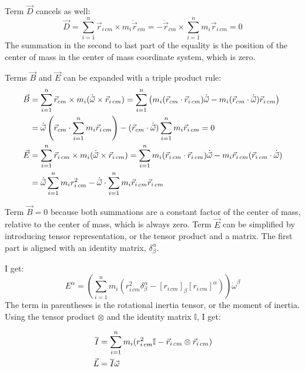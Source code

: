 \documentclass[10pt]{article}
\begin{document}
Term $\vec{D}$ cancels as well:
\begin{equation*}
    \vec{D} = \sum_{i=1}^n\vec{r}_{i\,cm}\times m_i\ddot{\vec{r}}_{cm} 
        = -\ddot{\vec{r}}_{cm}\times\sum_{i=1}^n m_i\vec{r}_{i\,cm} = 0
\end{equation*}
The summation in the second to last part of the equality is the 
position of the center of mass in the center of mass coordinate system, which 
is zero.

Terms $\vec{B}$ and $\vec{E}$ can be expanded with a triple product rule:
\begin{align}
    \vec{B} &= \sum_{i=1}^n\vec{r}_{cm}\times m_i
        (\dot{\vec{\omega}}\times\vec{r}_{i\,cm}) =
    \sum_{i=1}^n 
        \left(m_i(\vec{r}_{cm}\cdot\vec{r}_{i\,cm})\dot{\vec{\omega}} -
        m_i(\vec{r}_{cm}\cdot\dot{\vec{\omega}})\vec{r}_{i\,cm}\right) \notag \\
    &=\dot{\vec{\omega}}\left(\vec{r}_{cm}\cdot\sum_{i=1}^n 
        m_i\vec{r}_{i\,cm}\right) -
       (\vec{r}_{cm}\cdot\dot{\vec{\omega}})\sum_{i=1}^n
        m_i\vec{r}_{i\,cm} = 0 \notag \\
    \vec{E}&=\sum_{i=1}^n\vec{r}_{i\,cm}\times m_i 
        (\dot{\vec{\omega}}\times\vec{r}_{i\,cm}) =
    \sum_{i=1}^n 
        m_i(\vec{r}_{i\,cm}\cdot\vec{r}_{i\,cm})\dot{\vec{\omega}} - 
        m_i\vec{r}_{i\,cm}(\vec{r}_{i\,cm}\cdot\dot{\vec{\omega}})\notag \\
    &=\dot{\vec{\omega}}\sum_{i=1}^n m_i r^2_{i\,cm} - 
        \dot{\vec{\omega}}\cdot\sum_{i=1}^n m_i\vec{r}_{i\,cm}\vec{r}_{i\,cm}
\end{align}

Term $\vec{B} = 0$ because both summations are a constant factor of 
the center of mass, relative to the center of mass, which is always zero. Term 
$\vec{E}$ can be simplified by introducing tensor representation, or the 
tensor product and a matrix. The first part is aligned with an identity matrix, 
$\delta^\alpha_\beta$. 

I get:
\begin{equation}
    E^\alpha = \left(\sum_{i=1}^n m_i(r^2_{i\,cm}\delta^\alpha_\beta - 
            [r_{i\,cm}]_\beta[r_{i\,cm}]^\alpha)\right)\dot{\omega}^\beta
\end{equation}
The term in parentheses is the rotational inertia tensor, or the moment of 
inertia. Using the tensor product $\otimes$ and the 
identity matrix $\mathbb{I}$, I get:

\begin{align}
    \overline{I} &= \sum_{i=1}^n m_i (r^2_{i\,cm}\mathbb{I} - 
        \vec{r}_{i\,cm}\otimes\vec{r}_{i\,cm}) \\
    \vec{L} &= \overline{I}\vec{\omega} \label{Lrigid} \notag
\end{align}
\end{document}
